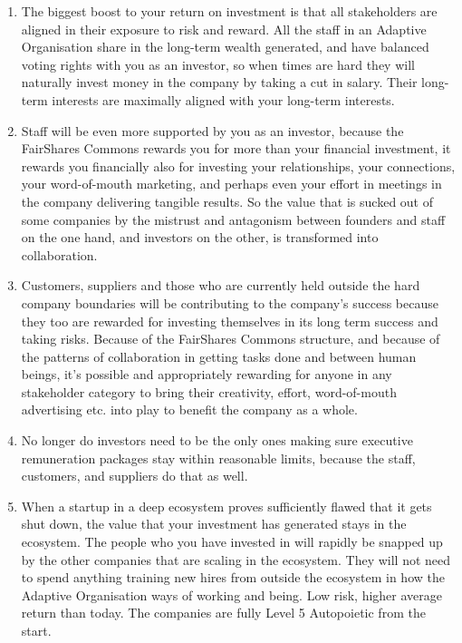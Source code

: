 \begin{enumerate}
\item The biggest boost to your return on investment is that all stakeholders are aligned in their exposure to risk and reward. All the staff in an Adaptive Organisation share in the long-term wealth generated, and have balanced voting rights with you as an investor, so when times are hard they will naturally invest money in the company by taking a cut in salary. Their long-term interests are maximally aligned with your long-term interests.


\item Staff will be even more supported by you as an investor, because the FairShares Commons  rewards you for more than your financial investment, it rewards you financially also for investing your relationships, your connections, your word-of-mouth marketing, and perhaps even your effort in meetings in the company delivering tangible results. So the value that is sucked out of some companies by the mistrust and antagonism between founders and staff on the one hand, and investors on the other, is transformed into collaboration.


\item Customers, suppliers and those who are currently held outside the hard company boundaries will be contributing to the company’s success because they too are rewarded for investing themselves in its long term success and taking risks. Because of the FairShares Commons structure, and because of the patterns of collaboration in getting tasks done and between human beings, it's possible and appropriately rewarding for anyone in any stakeholder category to bring their creativity, effort, word-of-mouth advertising etc. into play to benefit the company as a whole.


\item No longer do investors need to be the only ones making sure executive remuneration packages stay within reasonable limits, because the staff, customers, and suppliers do that as well. 


\item When a startup in a deep ecosystem proves sufficiently flawed that it gets shut down, the value that your investment has generated stays in the ecosystem. The people who you have invested in will rapidly be snapped up by the other companies that are scaling in the ecosystem. They will not need to spend anything training new hires from outside the ecosystem in how the Adaptive Organisation ways of working and being. Low risk, higher average return than today. The companies are fully Level 5 Autopoietic  from the start.



\end{enumerate}
